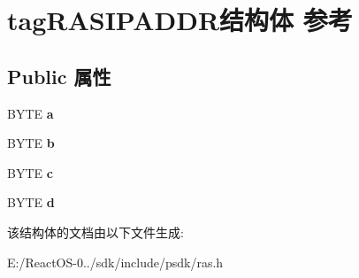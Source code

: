 \hypertarget{structtag_r_a_s_i_p_a_d_d_r}{}\section{tag\+R\+A\+S\+I\+P\+A\+D\+D\+R结构体 参考}
\label{structtag_r_a_s_i_p_a_d_d_r}
\subsection*{Public 属性}
\begin{DoxyCompactItemize}
\item 
\mbox{\label{structtag_r_a_s_i_p_a_d_d_r_a70035484975b685d0cf979a68fe82695}} 
B\+Y\+TE {\bfseries a}
\item 
\mbox{\label{structtag_r_a_s_i_p_a_d_d_r_ad54da59253f64e11dc2635f85fe0d39d}} 
B\+Y\+TE {\bfseries b}
\item 
\mbox{\label{structtag_r_a_s_i_p_a_d_d_r_a3f54ff1126b98221e0247ee64f98c4c5}} 
B\+Y\+TE {\bfseries c}
\item 
\mbox{\label{structtag_r_a_s_i_p_a_d_d_r_ab06d9c0b7d0ee8babcee2857a4aae5f4}} 
B\+Y\+TE {\bfseries d}
\end{DoxyCompactItemize}


该结构体的文档由以下文件生成\+:\begin{DoxyCompactItemize}
\item 
E\+:/\+React\+O\+S-\/0../sdk/include/psdk/ras.\+h\end{DoxyCompactItemize}
